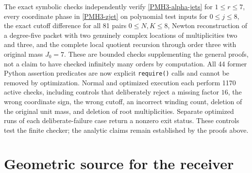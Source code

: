 \documentclass[11pt]{article}
\begin{document}
The exact symbolic checks independently verify
\eqref{PMH3-alpha-jets} for $1\le r\le7$, every coordinate phase
in \eqref{PMH3-zjet} on polynomial test inputs for $0\le j\le8$,
the exact cutoff difference for all 81 pairs $0\le N,K\le8$,
Newton reconstruction of a degree-five packet with two genuinely
complex locations of multiplicities two and three, and the complete
local quotient recursion through order three with original mass
$J_0=7$. These are bounded checks supplementing the general proofs,
not a claim to have checked infinitely many orders by computation.
All 44 former Python assertion predicates are now explicit
\texttt{require()} calls and cannot be removed by optimization.
Normal and optimized execution each perform 1170 active checks,
including controls that deliberately reject a missing factor $16$,
the wrong coordinate sign, the wrong cutoff, an incorrect winding
count, deletion of the original unit mass, and deletion of root
multiplicities. Separate optimized runs of each deliberate-failure
case return a nonzero exit status. These controls test the finite
checker; the analytic claims remain established by the proofs above.



\section{Geometric source for the receiver}
\end{document}
